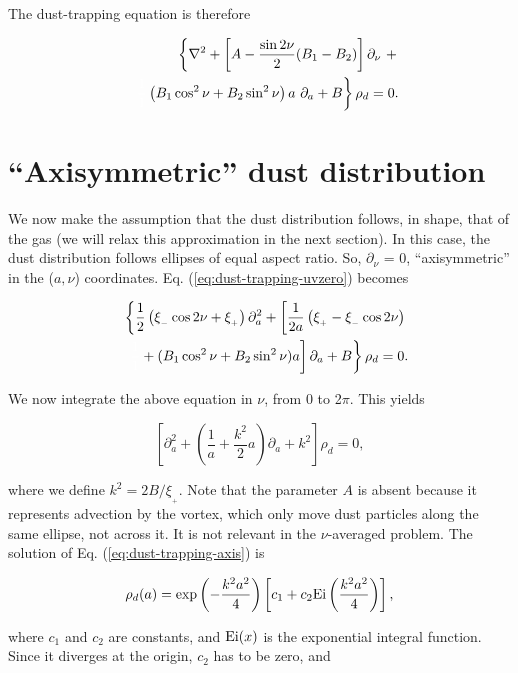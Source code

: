 \documentclass[apj]{emulateapj}
\def\white#1{\textcolor{white}{#1}}
\def\blue#1{\textcolor{blue}{#1}}
\newcommand{\Laplace}{\nabla^2}
\newcommand{\Eq}[1]{Eq. (\ref{#1})}
\newcommand{\eq}[1]{\Eq{#1}}
\newcommand{\beq}{\begin{equation}}
\newcommand{\eeq}{\end{equation}}
\newcommand{\beqn}{\begin{eqnarray}}
\newcommand{\eeqn}{\end{eqnarray}}
\newcommand{\epsp}{\xi_{_{+}}}
\newcommand{\epsm}{\xi_{_{-}}}
\begin{document}
The dust-trapping equation is therefore 

\beqn 
&& \left\{ \Laplace{} + \left[A - \frac{\sin2\nu}{2}  (B_1 - B_2)\right]\partial_\nu \ +  \right.  \nonumber\\
&& \left. \white{\frac{1}{1}}\left( B_1 \cos^2\nu   + B_2\sin^2\nu
  \right) a \ \partial_a  + B \right\} \rho_d = 0. \label{eq:dust-trapping-uvzero}
\eeqn


\section{``Axisymmetric'' dust distribution}
\label{sect:axisymmetric}

We now make the assumption that the dust distribution follows, in shape, that of
the gas (we will relax this approximation in the next section). In this case, the
dust distribution follows ellipses of equal aspect ratio. So,
$\partial_\nu$ = 0, ``axisymmetric'' in the ($a,\nu$)
coordinates. \eq{eq:dust-trapping-uvzero} becomes

\beqn
&&\left\{\frac{1}{2}\left(\epsm \cos 2\nu +\epsp\right) \partial^2_a  +  \left[\frac{1}{2a}\left( \epsp - \epsm\cos 2\nu\right) \right.\right. \nonumber\\
&&\left.\left.\white{\frac{1}{1}}+ (B_1\cos^2\nu +  B_2\sin^2\nu)a\right] \partial_a  + B\right\} \rho_d = 0. \label{eq:axi}
\eeqn

We now integrate the above equation in $\nu$, from 0 to 2$\pi$. This yields

\beq\label{eq:dust-trapping-axis}
\left[\partial^2_a  +  \left(\frac{1}{a} +  \frac{k^2}{2}a\right) \partial_a  + k^2\right]\rho_d = 0, 
\eeq

\noindent where we define $k^2=2B/\epsp$. Note that the parameter $A$
is absent because it represents advection by the vortex, which only
move dust particles along the same ellipse, not across it. It is
not relevant in the $\nu$-averaged problem. The solution of
\eq{eq:dust-trapping-axis} is 

\beq
\rho_d(a) = \exp\left(-\frac{k^2a^2}{4}\right)  \left[c_1 + c_2 {\rm
    Ei}\left(\frac{k^2a^2}{4}\right)\right],
\eeq

\noindent where $c_1$ and $c_2$ are constants, and ${\rm Ei}(x)$ is
the exponential integral function. Since it diverges at the origin, $c_2$ has to be zero, and 
\end{document}
